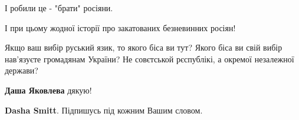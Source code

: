 \begin{itemize}
І робили це - "брати" росіяни.

І при цьому жодної історії про закатованих безневинних росіян!

Якщо ваш вибір руський язик, то якого біса ви тут? Якого біса ви свій вибір
нав'язуєте громадянам України? Не совєтськой рєспублікі, а окремої незалежної
держави?

\begin{itemize}

\textbf{Даша Яковлева} дякую!


\textbf{Dasha Smitt}. Підпишусь під кожним Вашим словом.
\end{itemize}

\end{itemize}

